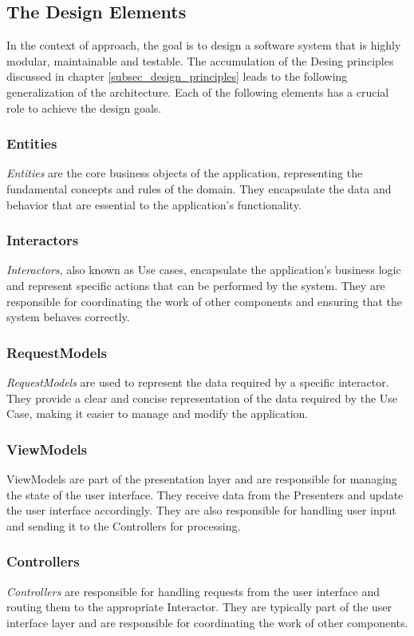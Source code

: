 \subsection{The Design Elements} \label{subsec_design_elements}

In the context of \ns approach, the goal is to design a software system that is highly
modular, maintainable and testable. The accumulation of the Desing principles discussed
in chapter \ref{subsec_design_principles} leads to the following generalization of the
architecture. Each of the following elements has a crucial role to achieve the
design goals.

\subsubsection{Entities}
\textit{Entities} are the core business objects of the application, representing the fundamental
concepts and rules of the domain. They encapsulate the data and behavior that are
essential to the application's functionality.

\subsubsection{Interactors}
\textit{Interactors}, also known as Use cases, encapsulate the application's business
logic and represent specific actions that can be performed by the system. They are
responsible for coordinating the work of other components and ensuring that the system
behaves correctly.

\subsubsection{RequestModels}
\textit{RequestModels} are used to represent the data required by a specific interactor. They
provide a clear and concise representation of the data required by the Use Case, making it
easier to manage and modify the application.

\subsubsection{ViewModels}
ViewModels are part of the presentation layer and are responsible for managing the state
of the user interface. They receive data from the Presenters and update the user interface
accordingly. They are also responsible for handling user input and sending it to the
Controllers for processing.

\subsubsection{Controllers}
\textit{Controllers} are responsible for handling requests from the user interface and
routing them to the appropriate Interactor. They are typically part of the user interface
layer and are responsible for coordinating the work of other components.

